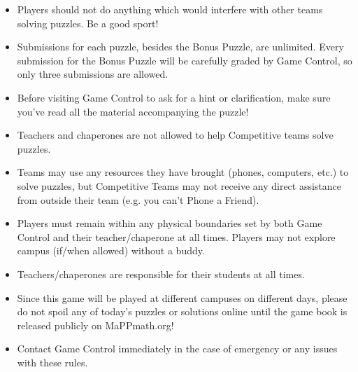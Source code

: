 
\begin{itemize}
\item Players should not do anything which
would interfere with other teams solving puzzles. Be a good sport!
\item Submissions for each puzzle, besides the Bonus Puzzle, are unlimited.
Every submission for the Bonus Puzzle will be carefully graded by Game Control,
so only three submissions are allowed.
\item Before visiting Game Control to ask for a hint or clarification, make
sure you've read all the material accompanying the puzzle!
\item Teachers and chaperones are not allowed to help Competitive teams solve
puzzles.
\item Teams may use any resources they have brought (phones, computers, etc.)
to solve puzzles, but Competitive Teams may not receive any direct
assistance from outside their team (e.g. you can't Phone a Friend).
\item Players must remain within any physical boundaries set by both
Game Control and their teacher/chaperone at all times. Players may not explore
campus (if/when allowed) without a buddy.
\item Teachers/chaperones are responsible for their students at
all times.
\item Since this game will be played at different campuses on different
days, please do not spoil any of today's puzzles or solutions online until
the game book is released publicly on MaPPmath.org!
\item Contact Game Control immediately in the case of emergency
or any issues with these rules.
\end{itemize}

